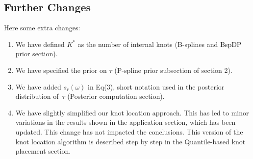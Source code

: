 \documentclass{scrartcl}
\begin{document}
\subsection*{Further Changes}
Here some extra changes:
\begin{enumerate}
	\item We have defined $K^*$ as the number of internal knots (B-splines and BspDP prior section).
	\item We have specified the prior on $\tau$ (P-spline prior subsection of section 2). 
	\item We have added $s_r(\omega)$ in Eq(3), short notation used in the posterior distribution of~$\tau$ (Posterior computation section).	
	\item We have slightly simplified our knot location approach.  This has led to minor variations in the results shown in the application section, which has been updated.  This change has not impacted the conclusions.  This version of the knot location algorithm is described step by step in the Quantile-based knot placement section.
\end{enumerate}




\end{document}
